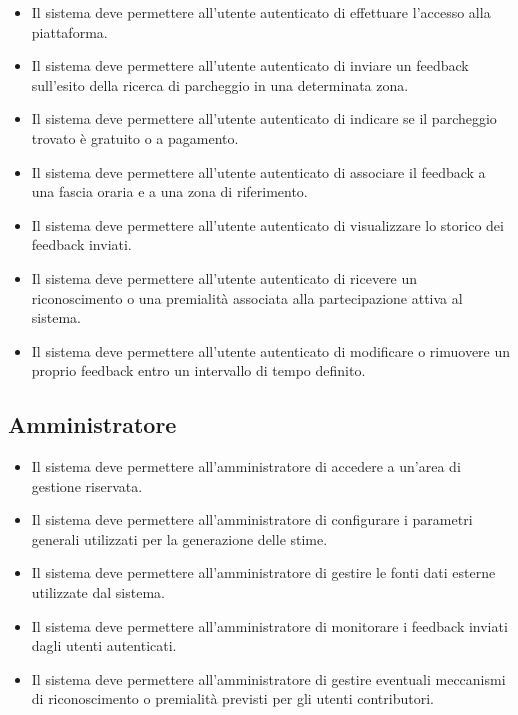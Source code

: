 \documentclass[a4paper,12pt]{article}
\begin{document}
\begin{itemize}[leftmargin=2cm]
    \item[\textbf{RF9:}] Il sistema deve permettere all'utente autenticato di effettuare l'accesso alla piattaforma.
    \item[\textbf{RF10:}] Il sistema deve permettere all'utente autenticato di inviare un feedback sull'esito della ricerca di parcheggio in una determinata zona.
    \item[\textbf{RF11:}] Il sistema deve permettere all'utente autenticato di indicare se il parcheggio trovato \`e gratuito o a pagamento.
    \item[\textbf{RF12:}] Il sistema deve permettere all'utente autenticato di associare il feedback a una fascia oraria e a una zona di riferimento.
    \item[\textbf{RF13:}] Il sistema deve permettere all'utente autenticato di visualizzare lo storico dei feedback inviati.
    \item[\textbf{RF14:}] Il sistema deve permettere all'utente autenticato di ricevere un riconoscimento o una premialit\`a associata alla partecipazione attiva al sistema.
    \item[\textbf{RF15:}] Il sistema deve permettere all'utente autenticato di modificare o rimuovere un proprio feedback entro un intervallo di tempo definito.
\end{itemize}

\subsection{Amministratore}

\begin{itemize}[leftmargin=2cm]
    \item[\textbf{RF16:}] Il sistema deve permettere all'amministratore di accedere a un'area di gestione riservata.
    \item[\textbf{RF17:}] Il sistema deve permettere all'amministratore di configurare i parametri generali utilizzati per la generazione delle stime.
    \item[\textbf{RF18:}] Il sistema deve permettere all'amministratore di gestire le fonti dati esterne utilizzate dal sistema.
    \item[\textbf{RF19:}] Il sistema deve permettere all'amministratore di monitorare i feedback inviati dagli utenti autenticati.
    \item[\textbf{RF20:}] Il sistema deve permettere all'amministratore di gestire eventuali meccanismi di riconoscimento o premialit\`a previsti per gli utenti contributori.
\end{itemize}
\end{document}
